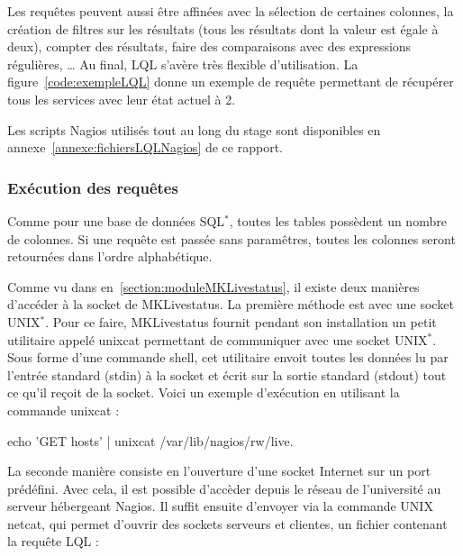 \vspace{0.20cm}

Les requ\^etes peuvent aussi \^etre affin\'ees avec la s\'election de certaines colonnes, la cr\'eation de filtres sur les r\'esultats (tous les r\'esultats dont la valeur est \'egale \`a deux), compter des r\'esultats, faire des comparaisons avec des expressions r\'eguli\`eres, \ldots{}
Au final, LQL s'av\`ere tr\`es flexible d'utilisation.
La figure~\ref{code:exempleLQL} donne un exemple de requ\^ete permettant de r\'ecup\'erer tous les services avec leur \'etat actuel \`a 2.

\vspace{0.20cm}


\label{code:exempleLQL}

Les scripts Nagios utilis\'es tout au long du stage sont disponibles en annexe~\ref{annexe:fichiersLQLNagios} de ce rapport.

\subsubsection{Ex\'ecution des requ\^etes}

Comme pour une base de donn\'ees SQL$^*$, toutes les tables poss\`edent un nombre de colonnes.
Si une requ\^ete est pass\'ee sans param\^etres, toutes les colonnes seront retourn\'ees dans l'ordre alphab\'etique.

Comme vu dans en~\ref{section:moduleMKLivestatus}, il existe deux mani\`eres d'acc\'eder \`a la socket de MKLivestatus.
La premi\`ere m\'ethode est avec une socket UNIX$^*$. 
Pour ce faire, MKLivestatus fournit pendant son installation un petit utilitaire appel\'e \textsf{unixcat} permettant de communiquer avec une socket UNIX$^*$.
Sous forme d'une commande shell, cet utilitaire envoit toutes les donn\'ees lu par l'entr\'ee standard (stdin) \`a la socket et \'ecrit sur la sortie standard (stdout) tout ce qu'il re\c{c}oit de la socket.
Voici un exemple d'ex\'ecution en utilisant la commande \textsf{unixcat} : 

\begin{center}
	\textsf{echo 'GET hosts' | unixcat /var/lib/nagios/rw/live}.

\end{center}

La seconde mani\`ere consiste en l'ouverture d'une socket Internet sur un port pr\'ed\'efini.
Avec cela, il est possible d'acc\`eder depuis le r\'eseau de l'universit\'e au serveur h\'ebergeant Nagios.
Il suffit ensuite d'envoyer via la commande UNIX \textsf{netcat}, qui permet d'ouvrir des sockets serveurs et clientes, un fichier contenant la requ\^ete LQL :

